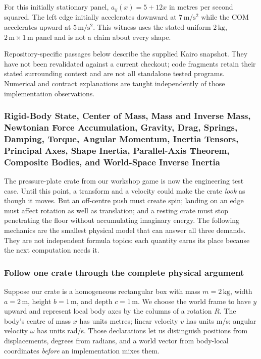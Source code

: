 For this initially stationary panel, \(a_y(x)=5+12x\) in metres per second squared. The left edge initially accelerates downward at \(7\,\mathrm{m/s^2}\) while the COM accelerates upward at \(5\,\mathrm{m/s^2}\). This witness uses the stated uniform \(2\,\mathrm{kg}\), \(2\,\mathrm m\times1\,\mathrm m\) panel and is not a claim about every shape.

Repository-specific passages below describe the supplied Kairo snapshot. They have not been revalidated against a current checkout; code fragments retain their stated surrounding context and are not all standalone tested programs. Numerical and contract explanations are taught independently of those implementation observations.

\subsubsection{Rigid-Body State, Center of Mass, Mass and Inverse Mass, Newtonian Force Accumulation, Gravity, Drag, Springs, Damping, Torque, Angular Momentum, Inertia Tensors, Principal Axes, Shape Inertia, Parallel-Axis Theorem, Composite Bodies, and World-Space Inverse Inertia}\label{rigid-body-state-center-of-mass-mass-and-inverse-mass-newtonian-force-accumulation-gravity-drag-springs-damping-torque-angular-momentum-inertia-tensors-principal-axes-shape-inertia-parallel-axis-theorem-composite-bodies-and-world-space-inverse-inertia}

The pressure-plate crate from our workshop game is now the engineering test case. Until this point, a transform and a velocity could make the crate \emph{look} as though it moves. But an off-centre push must create spin; landing on an edge must affect rotation as well as translation; and a resting crate must stop penetrating the floor without accumulating imaginary energy. The following mechanics are the smallest physical model that can answer all three demands. They are not independent formula topics: each quantity earns its place because the next computation needs it.

\subsubsection{Follow one crate through the complete physical argument}\label{follow-one-crate-through-the-complete-physical-argument}

Suppose our crate is a homogeneous rectangular box with mass \(m=2\,\mathrm{kg}\), width \(a=2\,\mathrm m\), height \(b=1\,\mathrm m\), and depth \(c=1\,\mathrm m\). We choose the world frame to have \(y\) upward and represent local body axes by the columns of a rotation \(R\). The body's centre of mass \(x\) has units metres; linear velocity \(v\) has units m/s; angular velocity \(\omega\) has units rad/s. Those declarations let us distinguish positions from displacements, degrees from radians, and a world vector from body-local coordinates \emph{before} an implementation mixes them.

